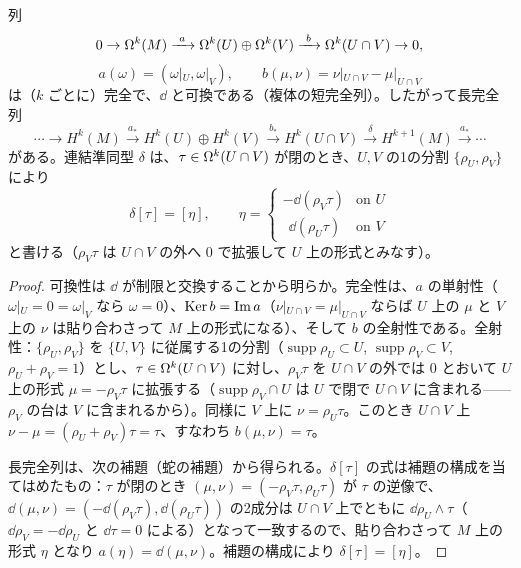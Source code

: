 \begin{thm}\label{B:thm:MV}\tP
列
\[
0\to\Om^k(M)\xrightarrow{\ a\ }\Om^k(U)\oplus\Om^k(V)\xrightarrow{\ b\ }\Om^k(U\cap V)\to0,
\]
\[
a(\omega)=(\omega|_U,\omega|_V),\qquad b(\mu,\nu)=\nu|_{U\cap V}-\mu|_{U\cap V}
\]
は（$k$ ごとに）完全で、$\dd$ と可換である（複体の短完全列）。したがって長完全列
\[
\cdots\to H^k(M)\xrightarrow{a_*}H^k(U)\oplus H^k(V)\xrightarrow{b_*}H^k(U\cap V)\xrightarrow{\ \delta\ }H^{k+1}(M)\xrightarrow{a_*}\cdots
\]
がある。連結準同型 $\delta$ は、$\tau\in\Omega^k(U\cap V)$ が閉のとき、$U,V$ の1の分割 $\{\rho_U,\rho_V\}$ により
\[
\delta[\tau]=[\eta],\qquad\eta=\begin{cases}-\dd(\rho_V\tau)&\text{on }U\\ \ \ \dd(\rho_U\tau)&\text{on }V\end{cases}
\]
と書ける（$\rho_V\tau$ は $U\cap V$ の外へ $0$ で拡張して $U$ 上の形式とみなす）。
\end{thm}
\begin{proof}
可換性は $\dd$ が制限と交換することから明らか。完全性は、$a$ の単射性（$\omega|_U=0=\omega|_V$ なら $\omega=0$）、$\operatorname{Ker} b=\operatorname{Im} a$（$\nu|_{U\cap V}=\mu|_{U\cap V}$ ならば $U$ 上の $\mu$ と $V$ 上の $\nu$ は貼り合わさって $M$ 上の形式になる）、そして $b$ の全射性である。全射性：$\{\rho_U,\rho_V\}$ を $\{U,V\}$ に従属する1の分割（$\operatorname{supp}\rho_U\subset U$, $\operatorname{supp}\rho_V\subset V$, $\rho_U+\rho_V=1$）とし、$\tau\in\Omega^k(U\cap V)$ に対し、$\rho_V\tau$ を $U\cap V$ の外では $0$ とおいて $U$ 上の形式 $\mu=-\rho_V\tau$ に拡張する（$\operatorname{supp}\rho_V\cap U$ は $U$ で閉で $U\cap V$ に含まれる——$\rho_V$ の台は $V$ に含まれるから）。同様に $V$ 上に $\nu=\rho_U\tau$。このとき $U\cap V$ 上 $\nu-\mu=(\rho_U+\rho_V)\tau=\tau$、すなわち $b(\mu,\nu)=\tau$。

長完全列は、次の補題（蛇の補題）から得られる。$\delta[\tau]$ の式は補題の構成を当てはめたもの：$\tau$ が閉のとき $(\mu,\nu)=(-\rho_V\tau,\rho_U\tau)$ が $\tau$ の逆像で、$\dd(\mu,\nu)=(-\dd(\rho_V\tau),\dd(\rho_U\tau))$ の2成分は $U\cap V$ 上でともに $\dd\rho_U\wedge\tau$（$\dd\rho_V=-\dd\rho_U$ と $\dd\tau=0$ による）となって一致するので、貼り合わさって $M$ 上の形式 $\eta$ となり $a(\eta)=\dd(\mu,\nu)$。補題の構成により $\delta[\tau]=[\eta]$。
\end{proof}

